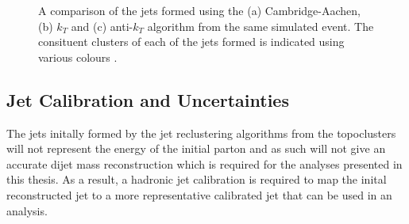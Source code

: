 \begin{figure}[!ht]
\begin{center}
  \end{center}
  \caption[A comparison of the jets formed using the (a) Cambridge-Aachen, (b) $k_T$ and (c) anti-$k_T$ algorithm from the same simulated event.
    The consituent clusters of each of the jets formed is indicated using various colours.]
          {A comparison of the jets formed using the (a) Cambridge-Aachen, (b) $k_T$ and (c) anti-$k_T$ algorithm from the same simulated event.
            The consituent clusters of each of the jets formed is indicated using various colours \cite{obj-jet_reco_salam}.}
  \label{fig:obj-jet_reco_shapes}
\end{figure}

\subsection{Jet Calibration and Uncertainties}
\label{sec:obj-jet_calib}

The jets initally formed by the jet reclustering algorithms from the topoclusters
will not represent the energy of the initial parton
and as such will not give an accurate dijet mass reconstruction which is required for the analyses presented in this thesis.
As a result, a hadronic jet calibration is required to map the inital reconstructed jet
to a more representative calibrated jet that can be used in an analysis.

